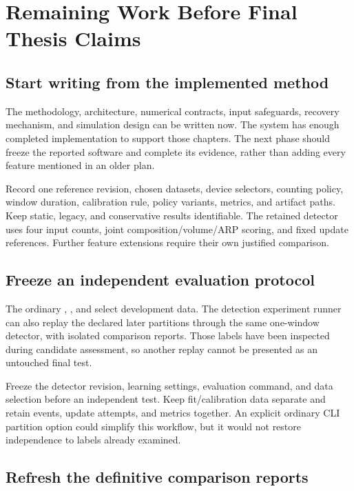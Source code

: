 \section{Remaining Work Before Final Thesis Claims}

\subsection{Start writing from the implemented method}

The methodology, architecture, numerical contracts, input safeguards, recovery
mechanism, and simulation design can be written now. The system has enough
completed implementation to support those chapters. The next phase should
freeze the reported software and complete its evidence, rather than adding
every feature mentioned in an older plan.

Record one reference revision, chosen datasets, device selectors, counting
policy, window duration, calibration rule, policy variants, metrics, and
artifact paths. Keep static, legacy, and conservative results identifiable.
The retained detector uses four input counts, joint composition/volume/ARP
scoring, and fixed update references. Further feature extensions require their
own justified comparison.

\subsection{Freeze an independent evaluation protocol}

The ordinary , , and
 select development data. The detection experiment
runner can also replay the declared later partitions through the same
one-window detector, with isolated comparison reports. Those labels have been
inspected during candidate assessment, so another replay cannot be presented
as an untouched final test.

Freeze the detector revision, learning settings, evaluation command, and data
selection before an independent test. Keep fit/calibration data separate and
retain events, update attempts, and metrics together. An explicit ordinary
CLI partition option could simplify this workflow, but it would not restore
independence to labels already examined.

\subsection{Refresh the definitive comparison reports}


